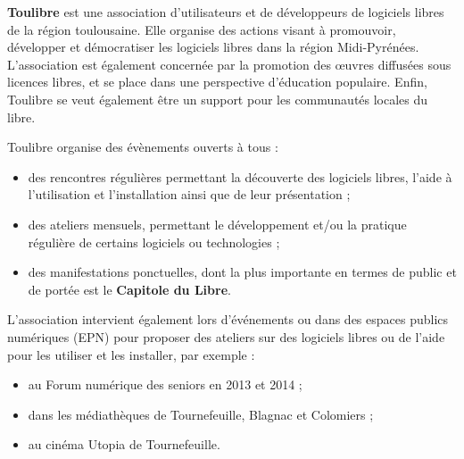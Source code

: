 
\textbf{Toulibre} est une association d'utilisateurs et de développeurs de logiciels libres de la région toulousaine. Elle organise des actions visant à promouvoir, développer et démocratiser les logiciels libres dans la région Midi-Pyrénées. L'association est également concernée par la promotion des œuvres diffusées sous licences libres, et se place dans une perspective d'éducation populaire. Enfin, Toulibre se veut également être un support pour les communautés locales du libre.

\Separateur

Toulibre organise des évènements ouverts à tous :
\begin{itemize}[label=$\bullet$]
\item des rencontres régulières permettant la découverte des logiciels libres, l'aide à l'utilisation et l'installation ainsi que de leur présentation ;
\item des ateliers mensuels, permettant le développement et/ou la 
pratique régulière de certains logiciels ou technologies ;
\item des manifestations ponctuelles, dont la plus importante en termes 
de public et de portée est le \textbf{Capitole du Libre}.
\end{itemize}

L'association intervient également lors d'événements ou dans des espaces publics numériques (EPN) pour proposer des ateliers sur des logiciels libres ou de l'aide pour les utiliser et les installer, par exemple :
\begin{itemize}[label=$\bullet$]
\item au Forum numérique des seniors en 2013 et 2014 ;
\item dans les médiathèques de Tournefeuille, Blagnac et Colomiers ;
\item au cinéma Utopia de Tournefeuille.
\end{itemize}
